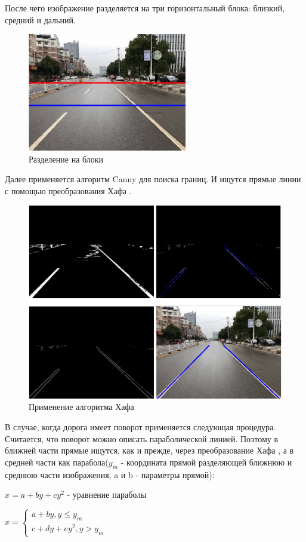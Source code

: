 После чего изображение разделяется на три горизонтальный блока: близкий, средний и дальний.
\begin{figure}[!h]
	\centering
	\includegraphics[width=0.7\linewidth,height=0.4\linewidth]{pictures/screenshot026}
	\caption{Разделение на блоки}
	\label{fig:screenshot026}
\end{figure}
\newpage
Далее применяется алгоритм Canny\cite{b:canny} для поиска границ. И ищутся прямые линии с помощью преобразования Хафа \cite{b:hough_transform}.
\begin{figure}[h!]
	\centering
	\includegraphics[width=0.7\linewidth]{pictures/screenshot027}
	\caption{Применение алгоритма Хафа}
	\label{fig:screenshot027}
\end{figure}

В случае, когда дорога имеет поворот применяется следующая процедура. Считается, что поворот можно описать параболической линией. Поэтому в ближней части прямые ищутся, как и прежде, через преобразование Хафа \cite{b:hough_transform}, а в средней части как парабола($y_m$ - координата прямой разделяющей ближнюю и среднюю части изображения, a и b - параметры прямой):

$x = a + by + cy^2$ - уравнение параболы

$
x =  
\begin{cases}
a + by, y \le y_m 
\\
c + dy + ey^2, y > y_m 
\end{cases}
$

